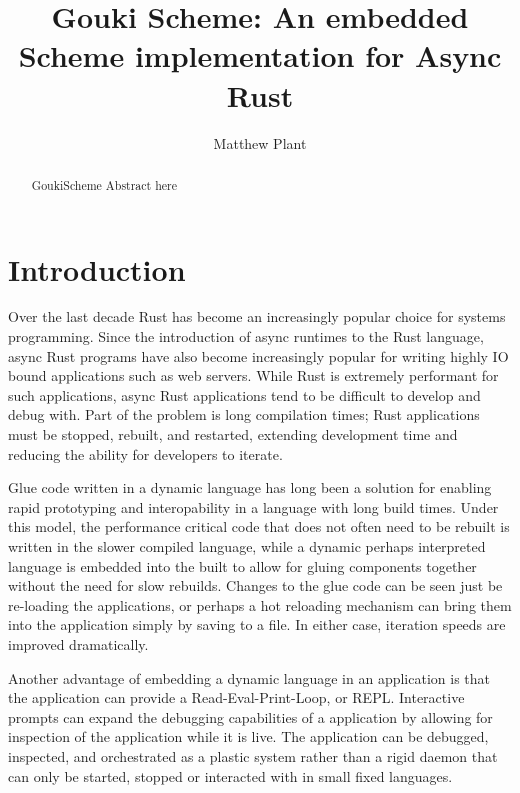 \documentclass[sigplan,authordraft]{acmart}
\begin{document}
\title{Gouki Scheme: An embedded Scheme implementation for Async Rust}

\author{Matthew Plant}

\begin{abstract}

  GoukiScheme Abstract here

\end{abstract}

\maketitle

\section{Introduction}

Over the last decade Rust has become an increasingly popular choice for systems
programming. Since the introduction of async runtimes to the Rust language,
async Rust programs have also become increasingly popular for writing highly
IO bound applications such as web servers. While Rust is extremely performant
for such applications, async Rust applications tend to be difficult to develop
and debug with. Part of the problem is long compilation times; Rust applications
must be stopped, rebuilt, and restarted, extending development time and reducing
the ability for developers to iterate.

Glue code written in a dynamic language has long been a solution for enabling
rapid prototyping and interopability in a language with long build times. Under
this model, the performance critical code that does not often need to be rebuilt
is written in the slower compiled language, while a dynamic perhaps interpreted
language is embedded into the built to allow for gluing components together
without the need for slow rebuilds. Changes to the glue code can be seen just be
re-loading the applications, or perhaps a hot reloading mechanism can bring them
into the application simply by saving to a file. In either case, iteration
speeds are improved dramatically.

Another advantage of embedding a dynamic language in an application is that the
application can provide a Read-Eval-Print-Loop, or REPL. Interactive prompts can
expand the debugging capabilities of a application by allowing for inspection of
the application while it is live. The application can be debugged, inspected, and
orchestrated as a plastic system rather than a rigid daemon that can only be
started, stopped or interacted with in small fixed languages.
\end{document}

